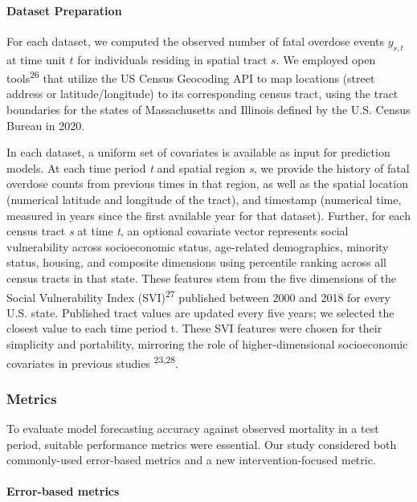 \paragraph{Dataset Preparation}\label{dataset-preparation}

For each dataset, we computed the observed number of fatal overdose events \(y_{s,t}\) at time unit \(t\) for individuals residing in spatial tract \(s\). We employed open tools\textsuperscript{26} that utilize the US Census Geocoding API to map locations (street address or latitude/longitude) to its corresponding census tract, using the tract boundaries for the states of Massachusetts and Illinois defined by the U.S. Census Bureau in 2020.

In each dataset, a uniform set of covariates is available as input for prediction models. At each time period \emph{t} and spatial region \emph{s}, we provide the history of fatal overdose counts from previous times in that region, as well as the spatial location (numerical latitude and longitude of the tract), and timestamp (numerical time, measured in years since the first available year for that dataset). Further, for each census tract \emph{s} at time \emph{t}, an optional covariate vector represents social vulnerability across socioeconomic status, age-related demographics, minority status, housing, and composite dimensions using percentile ranking across all census tracts in that state. These features stem from the five dimensions of the Social Vulnerability Index (SVI)\textsuperscript{27} published between 2000 and 2018 for every U.S. state. Published tract values are updated every five years; we selected the closest value to each time period t. These SVI features were chosen for their simplicity and portability, mirroring the role of higher-dimensional socioeconomic covariates in previous studies \textsuperscript{23,28}.

\subsubsection{Metrics}\label{metrics}

To evaluate model forecasting accuracy against observed mortality in a test period, suitable performance metrics were essential. Our study considered both commonly-used error-based metrics and a new intervention-focused metric.

\paragraph{Error-based metrics}\label{error-based-metrics}

